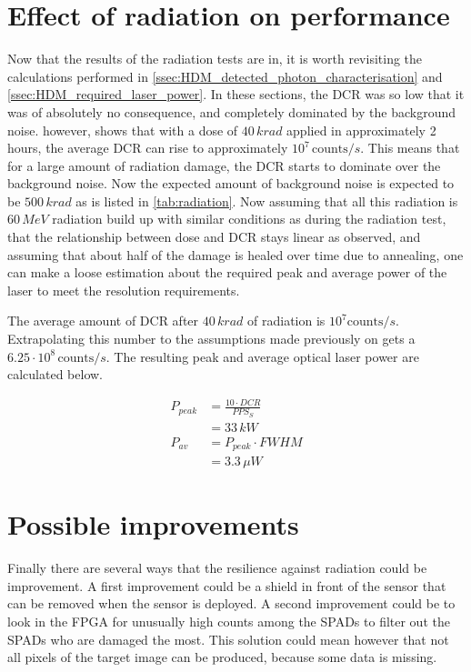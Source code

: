 \section{Effect of radiation on performance}\label{ssec:effect_on_performance}
Now that the results of the radiation tests are in, it is worth revisiting the calculations performed in \cref{ssec:HDM_detected_photon_characterisation} and \cref{ssec:HDM_required_laser_power}.
In these sections, the DCR was so low that it was of absolutely no consequence, and completely dominated by the background noise.  however, shows that with a dose of $40\,krad$ applied in approximately 2 hours, the average DCR can rise to approximately $10^{7}\,\text{counts}/s$. 
This means that for a large amount of radiation damage, the DCR starts to dominate over the background noise. Now the expected amount of background noise is expected to be $500\,krad$ as is listed in \cref{tab:radiation}. Now assuming that all this radiation is $60\,MeV$ radiation build up with similar conditions as during the radiation test, that the relationship between dose and DCR stays linear as observed, and assuming that about half of the damage is healed over time due to annealing, one can make a loose estimation about the required peak and average power of the laser to meet the resolution requirements.

The average amount of DCR after $40\,krad$ of radiation is $10^{7}\text{counts}/s$. Extrapolating this number to the assumptions made previously on gets a $6.25\cdot10^8\,\text{counts}/s$. The resulting peak and average optical laser power are calculated below.

\begin{align*}
	P_{peak}&= \frac{10\cdot DCR}{PPS_S}\\
	&= 33\,kW\\
	P_{av} &= P_{peak}\cdot FWHM\\
	&= 3.3\,\mu W
\end{align*}

\section{Possible improvements}\label{ssec:possible_improvements}
Finally there are several ways that the resilience against radiation could be improvement. A first improvement could be a shield in front of the sensor that can be removed when the sensor is deployed. A second improvement could be to look in the FPGA for unusually high counts among the SPADs to filter out the SPADs who are damaged the most. This solution could mean however that not all pixels of the target image can be produced, because some data is missing. 
